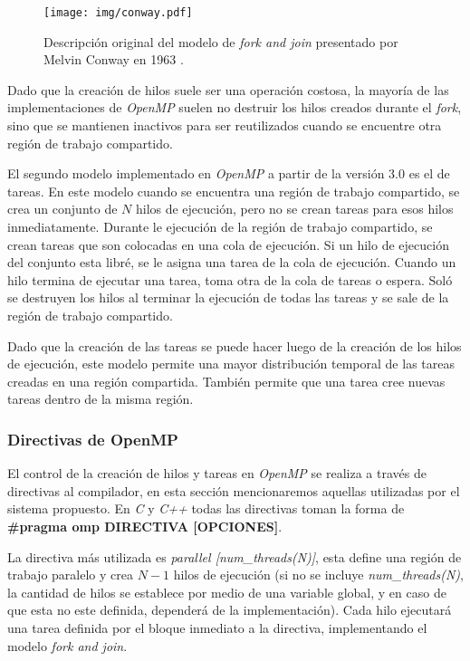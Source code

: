 \begin{figure}[h]

	\centering

	\texttt{[image: img/conway.pdf]}

	\caption{Descripción original del modelo de \emph{fork and join}
	presentado por Melvin Conway en 1963 \cite{conway1963}.}

	\label{conway}

\end{figure}

Dado que la creación de hilos suele ser una operación costosa, la mayoría de las
implementaciones de \emph{OpenMP} suelen no destruir los hilos creados durante
el \emph{fork}, sino que se mantienen inactivos para ser reutilizados cuando se
encuentre otra región de trabajo compartido.

El segundo modelo implementado en \emph{OpenMP} a partir de la versión 3.0 es
el de tareas. En este modelo cuando se encuentra una región de trabajo
compartido, se crea un conjunto de $N$ hilos de ejecución, pero no se crean
tareas para esos hilos inmediatamente. Durante le ejecución de la región de
trabajo compartido, se crean tareas que son colocadas en una cola de ejecución.
Si un hilo de ejecución del conjunto esta libré, se le asigna una tarea de la
cola de ejecución. Cuando un hilo termina de ejecutar una tarea, toma otra de la
cola de tareas o espera. Soló se destruyen los hilos al terminar la ejecución de
todas las tareas y se sale de la región de trabajo compartido.

Dado que la creación de las tareas se puede hacer luego de la creación de los
hilos de ejecución, este modelo permite una mayor distribución temporal de las
tareas creadas en una región compartida. También permite que una tarea cree
nuevas tareas dentro de la misma región.

\subsubsection{Directivas de OpenMP}

El control de la creación de hilos y tareas en \emph{OpenMP} se realiza a través
de directivas al compilador, en esta sección mencionaremos aquellas utilizadas
por el sistema propuesto. En \emph{C} y \emph{C++} todas las directivas toman la
forma de \textbf{\#pragma omp DIRECTIVA [OPCIONES]}.

La directiva más utilizada es \emph{parallel [num\_threads(N)]}, esta define una
región de trabajo paralelo y crea $N-1$ hilos de ejecución (si no se incluye
\emph{num\_threads(N)}, la cantidad de hilos se establece por medio de una
variable global, y en caso de que esta no este definida, dependerá de la
implementación). Cada hilo ejecutará una tarea definida por el bloque inmediato
a la directiva, implementando el modelo \emph{fork and join}.

